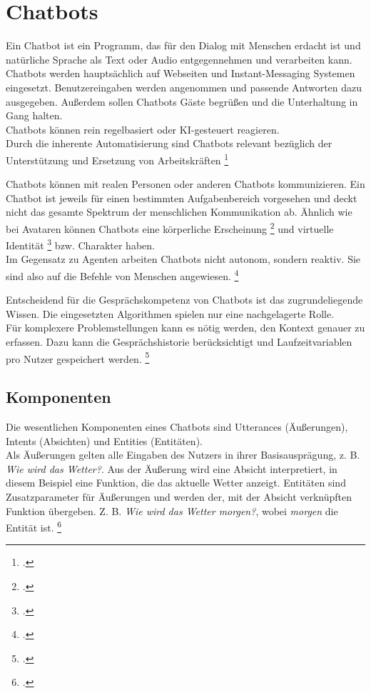 \section{Chatbots}
Ein Chatbot ist ein Programm, das für den Dialog mit Menschen erdacht ist und natürliche Sprache als Text oder Audio entgegennehmen und verarbeiten kann.
Chatbots werden hauptsächlich auf Webseiten und Instant-Messaging Systemen eingesetzt.
Benutzereingaben werden angenommen und passende Antworten dazu ausgegeben. Außerdem sollen Chatbots Gäste begrüßen und die Unterhaltung in Gang halten.\\
Chatbots können rein regelbasiert oder \acf{KI}-gesteuert reagieren.\\
Durch die inherente Automatisierung sind Chatbots relevant bezüglich der \glqq{}Unterstützung und Ersetzung von Arbeitskräften\grqq
\footcites[][o. \pno]{Bendel_2018_Chatbot_Definition}[Vgl.][o. \pno]{Bendel_2018_Chatbot_Definition}

Chatbots können mit realen Personen oder anderen Chatbots kommunizieren. Ein Chatbot ist jeweils für einen bestimmten Aufgabenbereich vorgesehen und deckt nicht das gesamte Spektrum der menschlichen Kommunikation ab. Ähnlich wie bei Avataren können Chatbots eine \glqq{}körperliche Erscheinung\grqq
\footcite[][71\psq]{de_Vries_2006}
und \glqq{}virtuelle Identität\grqq
\footcite[][71\psq]{de_Vries_2006}
bzw. Charakter haben.\\

Im Gegensatz zu Agenten arbeiten Chatbots nicht autonom, sondern reaktiv. Sie sind also auf die Befehle von Menschen angewiesen.
\footcite[Vgl.][69\psqq]{de_Vries_2006}

Entscheidend für die Gesprächskompetenz von Chatbots ist das zugrundeliegende Wissen. Die eingesetzten Algorithmen spielen nur eine nachgelagerte Rolle.\\
Für komplexere Problemstellungen  kann es nötig werden, den Kontext genauer zu erfassen. Dazu kann die Gesprächshistorie berücksichtigt und Laufzeitvariablen pro Nutzer gespeichert werden.
\footcite[Vgl.][82\psq]{Feindt_2006_Agenten}

\subsection{Komponenten}
Die wesentlichen Komponenten eines Chatbots sind Utterances (Äußerungen), Intents (Absichten) und Entities (Entitäten).\\
Als Äußerungen gelten alle Eingaben des Nutzers in ihrer Basisausprägung, z. B. \textit{Wie wird das Wetter?}.
Aus der Äußerung wird eine Absicht interpretiert, in diesem Beispiel eine Funktion, die das aktuelle Wetter anzeigt.
Entitäten sind Zusatzparameter für Äußerungen und werden der, mit der Absicht verknüpften Funktion übergeben. Z. B. \textit{Wie wird das Wetter morgen?}, wobei \textit{morgen} die Entität ist.
\footcite[Vgl.][51]{Groetz_2018_Sprich_mit_mir}

